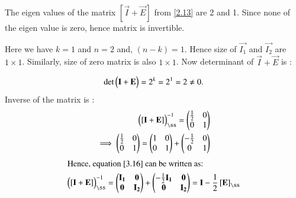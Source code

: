 \documentclass[journal,12pt,twocolumn]{IEEEtran}
\begin{document}
The eigen values of the matrix $\left[\vec{I} + \vec{E}\right]$ from \eqref{2.13} are  2 and 1. Since none of the eigen value is zero, hence matrix is invertible.

Here we have $k = 1$ and $ n = 2 $ and, $(n - k) = 1$. Hence size of  $\vec{I_1}$ and $\vec{I_2}$  are $ 1 \times 1$. Similarly, size of zero matrix is also $1 \times 1$.
Now determinant of $\vec{I} + \vec{E} $ is :



\begin{align}
\text{det}\begin{pmatrix}\mathbf{I} + \mathbf{E}\end{pmatrix} = 2^k=  2 ^1 = 2 \neq 0.
\end{align}
Inverse of the matrix is :
\begin{align}
  \myvec{ \left[ \vec{I} + \vec{E}\right]}_{\ss}^{-1} = \myvec{\frac{1}{2} & 0 \\ 0 & 1}\\
\implies \myvec{\frac{1}{2} & 0 \\ 0 & 1}  =\myvec{1 & 0 \\ 0 & 1} +  \myvec{ -\frac{1}{2} & 0 \\ 0 & 1} \label{3.16}
\end{align}
\begin{align}
\intertext{Hence, equation \eqref{3.16} can be written as:}
   \myvec{ \left[ \vec{I} + \vec{E}\right]}_{\ss}^{-1}  = \myvec{\vec{I_1} & \vec{0} \\
	\vec{0} & \vec{I_2} } +  \myvec{-\frac{1}{2}\vec{I_1} & \vec{0} \\
	\vec{0} & \vec{I_2}} = \vec{I} - \frac{1}{2}\left[\vec{E}\right]_{\ss}
\end{align}



















	
	
\end{document}
